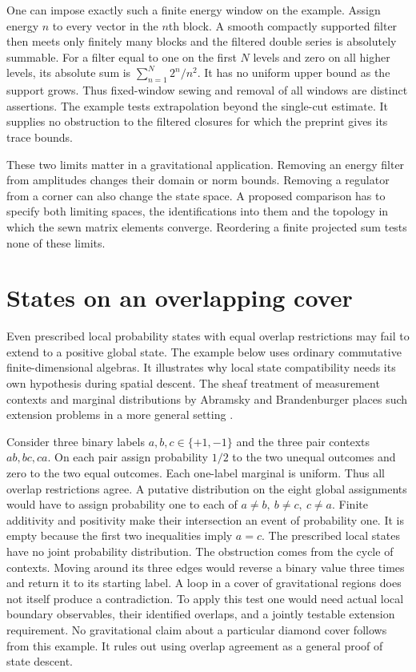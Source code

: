 \documentclass[11pt,letterpaper]{article}
\begin{document}
One can impose exactly such a finite energy window on the example.
Assign energy \(n\) to every vector in the \(n\)th block. A smooth
compactly supported filter then meets only finitely many blocks and
the filtered double series is absolutely summable. For a filter equal
to one on the first \(N\) levels and zero on all higher levels, its
absolute sum is \(\sum_{n=1}^N2^n/n^2\). It has no uniform upper
bound as the support grows. Thus fixed-window sewing and removal of all
windows are distinct assertions. The example tests extrapolation beyond
the single-cut estimate. It supplies no obstruction to the filtered
closures for which the preprint gives its trace bounds.

These two limits matter in a gravitational application. Removing an
energy filter from amplitudes changes their domain or norm bounds.
Removing a regulator from a corner can also change the state space.
A proposed comparison has to specify both limiting spaces, the
identifications into them and the topology in which the sewn matrix
elements converge. Reordering a finite projected sum tests none of these
limits.

\section{States on an overlapping cover}
\label{sec:states}
Even prescribed local probability states with equal overlap restrictions
may fail to extend to a positive global state. The example below uses
ordinary commutative finite-dimensional algebras. It illustrates why local
state compatibility needs its own hypothesis during spatial descent.
The sheaf treatment of measurement contexts and marginal distributions by
Abramsky and Brandenburger places such extension problems in a more general
setting \cite{ab}.

Consider three binary labels \(a,b,c\in\{+1,-1\}\) and the three pair
contexts \(ab,bc,ca\). On each pair assign probability \(1/2\) to the two
unequal outcomes and zero to the two equal outcomes. Each one-label
marginal is uniform. Thus all overlap restrictions agree.
A putative distribution on the eight global assignments would have to
assign probability one to each of \(a\ne b,\ b\ne c,\ c\ne a\). Finite
additivity and positivity make their intersection an event of probability
one. It is empty because the first two inequalities imply \(a=c\).
The prescribed local states have no joint probability distribution.
The obstruction comes from the cycle of contexts. Moving around its
three edges would reverse a binary value three times and return it to its
starting label. A loop in a cover of gravitational regions does not itself
produce a contradiction. To apply this test one would need actual local
boundary observables, their identified overlaps, and a jointly testable
extension requirement. No gravitational claim about a particular diamond
cover follows from this example. It rules out using overlap agreement as a general proof of state
descent.
\end{document}
